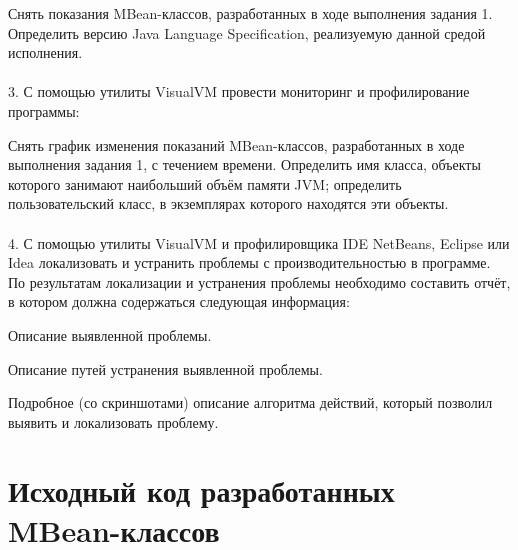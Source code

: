 \documentclass{article}
\begin{document}
Снять показания MBean-классов, разработанных в ходе выполнения задания 1.
Определить версию Java Language Specification, реализуемую данной средой исполнения.
\\ \\
3. С помощью утилиты VisualVM провести мониторинг и профилирование программы:

Снять график изменения показаний MBean-классов, разработанных в ходе выполнения задания 1, с течением времени.
Определить имя класса, объекты которого занимают наибольший объём памяти JVM; определить пользовательский класс, в экземплярах которого находятся эти объекты.
\\ \\
4. С помощью утилиты VisualVM и профилировщика IDE NetBeans, Eclipse или Idea локализовать и устранить проблемы с производительностью в программе. По результатам локализации и устранения проблемы необходимо составить отчёт, в котором должна содержаться следующая информация:

Описание выявленной проблемы.

Описание путей устранения выявленной проблемы.

Подробное (со скриншотами) описание алгоритма действий, который позволил выявить и локализовать проблему.
\section{Исходный код разработанных MBean-классов}
\end{document}
